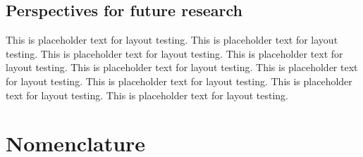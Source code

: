 \documentclass[a4paper,12pt,twoside]{report}     %
\begin{document}
\section{Perspectives for future research}
This is placeholder text for layout testing. This is placeholder text for layout testing. This is placeholder text for layout testing. This is placeholder text for layout testing. This is placeholder text for layout testing. This is placeholder text for layout testing. This is placeholder text for layout testing. This is placeholder text for layout testing. This is placeholder text for layout testing.




\cleardoublepage
\chapter*{Nomenclature}

\newpage
{}
\listoffigures

\newpage
{}
\listoftables

\newpage
{}
\printbibliography
\end{document}
